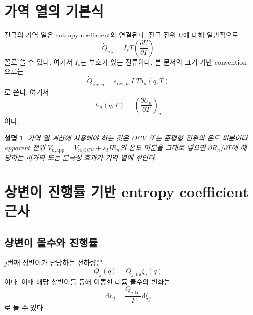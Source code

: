 \documentclass[11pt,a4paper]{article}
\newtheorem*{note}{설명}
\newcommand{\dd}{\mathrm{d}}
\newcommand{\OCV}{\mathrm{OCV}}
\newcommand{\app}{\mathrm{app}}
\newcommand{\tot}{\mathrm{tot}}
\begin{document}
\section{가역 열의 기본식}
전극의 가역 열은 entropy coefficient와 연결된다. 전극 전위 \(U\)에 대해 일반적으로
\begin{equation}
\dot Q_{\mathrm{rev}}=I_sT\left(\frac{\partial U}{\partial T}\right)
\label{eq:v2_rev_signed_general}
\end{equation}
꼴로 쓸 수 있다. 여기서 \(I_s\)는 부호가 있는 전류이다. 본 문서의 크기 기반 convention으로는
\begin{equation}
\dot Q_{\mathrm{rev},n}=s_{\mathrm{rev},n}|I|T h_n(q,T)
\label{eq:v2_rev_hn}
\end{equation}
로 쓴다. 여기서
\begin{equation}
h_n(q,T)=\left(\frac{\partial U_n}{\partial T}\right)_q
\label{eq:v2_hn_def}
\end{equation}
이다.

\begin{note}
가역 열 계산에 사용해야 하는 것은 OCV 또는 준평형 전위의 온도 미분이다. apparent 전위 \(V_{n,\app}=V_{n,\OCV}+s_IIR_n\)의 온도 미분을 그대로 넣으면 \(\partial R_n/\partial T\)에 해당하는 비가역 또는 분극성 효과가 가역 열에 섞인다.
\end{note}

\section{상변이 진행률 기반 entropy coefficient 근사}
\subsection{상변이 몰수와 진행률}
\(j\)번째 상변이가 담당하는 전하량은
\begin{equation}
Q_j(q)=Q_{j,\tot}\xi_j(q)
\label{eq:v2_Qj_xi}
\end{equation}
이다. 이때 해당 상변이를 통해 이동한 리튬 몰수의 변화는
\begin{equation}
\dd n_j=\frac{Q_{j,\tot}}{F}\dd\xi_j
\label{eq:v2_dn_xi}
\end{equation}
로 둘 수 있다.
\end{document}

